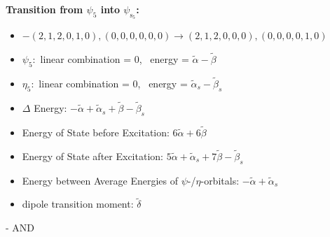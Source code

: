 \documentclass[12pt,a4paper]{article}
\begin{document}
        \noindent\textbf{Transition from $\psi_{5}$ into $\psi_{\text{s}_{5}}$:}
        \begin{itemize}
            \item $- (2, 1, 2, 0, 1, 0), (0, 0, 0, 0, 0, 0) \rightarrow (2, 1, 2, 0, 0, 0), (0, 0, 0, 0, 1, 0)$
        
            \item $\psi_{5}:$ linear combination = $0$, \
            energy = $\tilde{\alpha} - \tilde{\beta}$
            
            \item $\eta_{5}:$ linear combination = $0$, \
            energy = $\tilde{\alpha}_{s} - \tilde{\beta}_{s}$
            
                \item $\Delta$ Energy: $- \tilde{\alpha} + \tilde{\alpha}_{s} + \tilde{\beta} - \tilde{\beta}_{s}$
                \item Energy of State before Excitation: $6 \tilde{\alpha} + 6 \tilde{\beta}$
                \item Energy of State after Excitation: $5 \tilde{\alpha} + \tilde{\alpha}_{s} + 7 \tilde{\beta} - \tilde{\beta}_{s}$
                \item Energy between Average Energies of $\psi$-/$\eta$-orbitals: $- \tilde{\alpha} + \tilde{\alpha}_{s}$
            
            \item dipole transition moment: $\tilde{\delta}$
        
        \end{itemize}
        
 -  AND 
\end{document}
